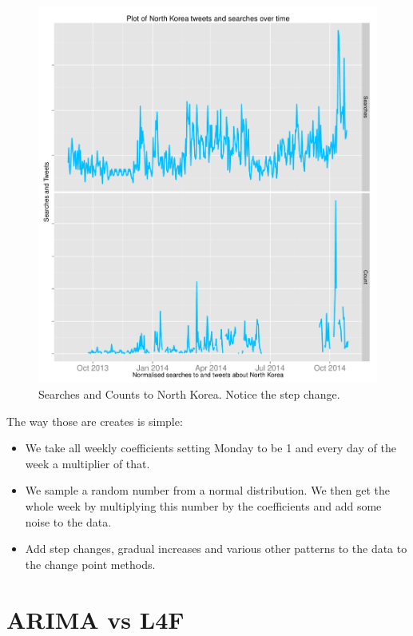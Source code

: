 \documentclass[minf,twoside,singlespacing,parskip,frontabs,notimes,12pt]{infthesis} %
\begin{document}
\begin{figure}[p!]
\begin{center}
\includegraphics[width=\textwidth]{North_Korea}
\end{center}
\caption{Searches and Counts to North Korea. Notice the step change. }
\label{NorthKoreaPlot}
\end{figure}

The way those are creates is simple:
\begin{itemize}
\item We take all weekly coefficients setting Monday to be 1 and every day of the week a multiplier of that. 
\item We sample a random number from a normal distribution. We then get the whole week by multiplying this number by the coefficients and add some noise to the data. 
\item Add step changes, gradual increases and various other patterns to the data to the change point methods.
\end{itemize}

\section{ARIMA vs L4F}
\end{document}
